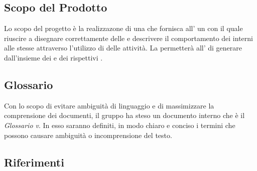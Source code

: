   \subsection{Scopo del Prodotto}
          Lo scopo del progetto è la realizzazone di una  che fornisca all' un   con il quale riuscire a disegnare correttamente  delle 
          e descrivere il comportamento dei  interni alle stesse attraverso l'utilizzo di  delle attività.
          La  permetterà all' di generare   dall'insieme dei  e dei rispettivi .
  \subsection{Glossario}
          Con lo scopo di evitare ambiguità di linguaggio e di massimizzare la comprensione dei documenti, il
          gruppo ha steso un documento interno che è il \emph{Glossario v}\VersioneG{}. In esso saranno definiti, in modo
          chiaro e conciso i termini che possono causare ambiguità o incomprensione del testo.
  \subsection{Riferimenti}
